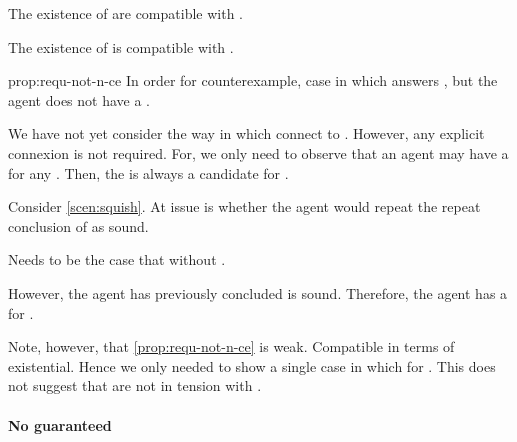 \begin{note}
  The existence of  are compatible with \issueConstraint{}.
  \begin{proposition}
    \label{prop:requ-not-n-ce}
    The existence of  is compatible with \issueConstraint{}.
  \end{proposition}
  \begin{argument}{prop:requ-not-n-ce}
    In order for counterexample, case in which \ros{} answers \qWhyV{}, but the agent does not have a \wit{}.

    We have not yet consider the way in which  connect to \qWhyV{}.
    However, any explicit connexion is not required.
    For, we only need to observe that an agent may have a \wit{} for any \requ{}.
    Then, the \wit{} is always a candidate for \qHowV{}.

    Consider \autoref{scen:squish}.
    At issue is whether the agent would repeat the repeat conclusion of \sqE{} as sound.

    Needs to be the case that \ros{} without \wit{}.

    However, the agent has previously concluded \sqE{} is sound.
    Therefore, the agent has a \wit{} for \ros{}.
  \end{argument}

  Note, however, that \autoref{prop:requ-not-n-ce} is weak.
  Compatible in terms of existential.
  Hence we only needed to show a single case in which \wit{} for \requ{}.
  This does not suggest that  are not in tension with \issueConstraint{}.
\end{note}

\paragraph*{No guaranteed }

